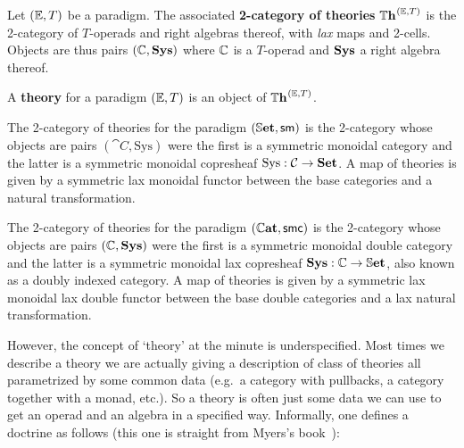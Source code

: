 \begin{definition}
	Let $\Paradigm$ be a paradigm.
	The associated \textbf{2-category of theories} $\Theories^\Paradigm$ is the 2-category of $T$-operads and right algebras thereof, with \emph{lax} maps and 2-cells.
	Objects are thus pairs $(\Comp, \Sys)$ where $\Comp$ is a $T$-operad and ${\mathbf{Sys}}$ a right algebra thereof.
\end{definition}

\begin{definition}[Theory]
	A \textbf{theory} for a paradigm $\Paradigm$ is an object of $\Theories^\Paradigm$.
\end{definition}

\begin{example}
	The 2-category of theories for the paradigm $(\dblSet, \SymOperads)$ is the 2-category whose objects are pairs $(\cat{C}, \mathrm{Sys})$ were the first is a symmetric monoidal category and the latter is a symmetric monoidal copresheaf $\mathrm{Sys} : \cat{C} \to \Set$.
	A map of theories is given by a symmetric lax monoidal functor between the base categories and a natural transformation.
\end{example}

\begin{example}
	The 2-category of theories for the paradigm $(\dblCat, \SymDblOperads)$ is the 2-category whose objects are pairs $(\compth{C}, \Sys)$ were the first is a symmetric monoidal double category and the latter is a symmetric monoidal lax copresheaf $\Sys:\compth{C} \to \dblSet$, also known as a doubly indexed category.
	A map of theories is given by a symmetric lax monoidal lax double functor between the base double categories and a lax natural transformation.
\end{example}

However, the concept of `theory' at the minute is underspecified.
Most times we describe a theory we are actually giving a description of class of theories all parametrized by some common data (e.g.~a category with pullbacks, a category together with a monad, etc.).
So a theory is often just some data we can use to get an operad and an algebra in a specified way.
Informally, one defines a doctrine as follows (this one is straight from Myers's book~\cite{myers_categorical_2022}):

